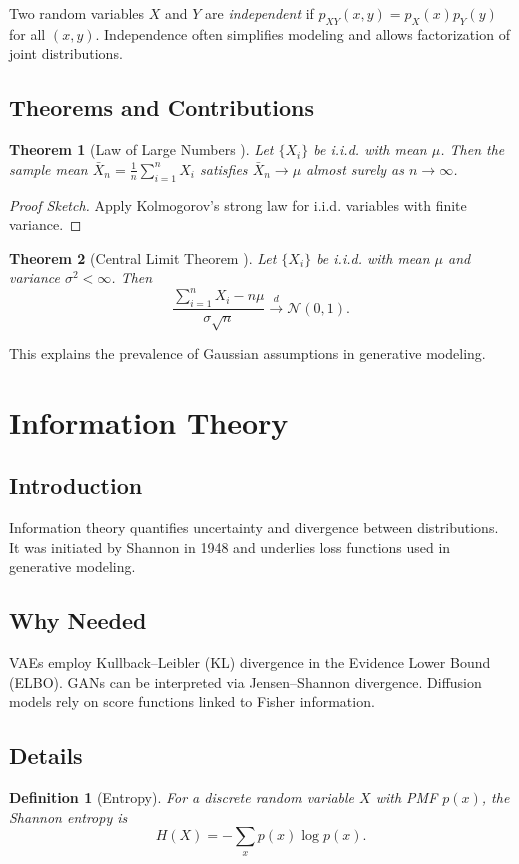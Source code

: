\documentclass[11pt]{book}
\newtheorem{theorem}{Theorem}[chapter]
\newtheorem{definition}{Definition}[chapter]
\begin{document}
Two random variables $X$ and $Y$ are \emph{independent} if $p_{XY}(x,y)=p_X(x)p_Y(y)$ for all $(x,y)$. Independence often simplifies modeling and allows factorization of joint distributions.

\subsection{Theorems and Contributions}
\begin{theorem}[Law of Large Numbers \cite{bernoulli1713}]
Let $\{X_i\}$ be i.i.d. with mean $\mu$. Then the sample mean $\bar{X}_n=\frac1n\sum_{i=1}^n X_i$ satisfies $\bar{X}_n\to\mu$ almost surely as $n\to\infty$.
\end{theorem}
\begin{proof}[Proof Sketch]
Apply Kolmogorov's strong law for i.i.d. variables with finite variance.
\end{proof}

\begin{theorem}[Central Limit Theorem \cite{laplace1812,lyapunov1901}]
Let $\{X_i\}$ be i.i.d. with mean $\mu$ and variance $\sigma^2<\infty$. Then
\begin{equation}
\frac{\sum_{i=1}^n X_i - n\mu}{\sigma\sqrt{n}} \xrightarrow{d} \mathcal{N}(0,1).
\end{equation}
\end{theorem}
This explains the prevalence of Gaussian assumptions in generative modeling.

\section{Information Theory}
\subsection{Introduction}
Information theory quantifies uncertainty and divergence between distributions. It was initiated by Shannon in 1948 and underlies loss functions used in generative modeling.

\subsection{Why Needed}
VAEs employ Kullback--Leibler (KL) divergence in the Evidence Lower Bound (ELBO). GANs can be interpreted via Jensen--Shannon divergence. Diffusion models rely on score functions linked to Fisher information.

\subsection{Details}
\begin{definition}[Entropy]
For a discrete random variable $X$ with PMF $p(x)$, the Shannon entropy is
\begin{equation}
H(X) = -\sum_x p(x)\log p(x).
\end{equation}
\end{definition}
\end{document}
